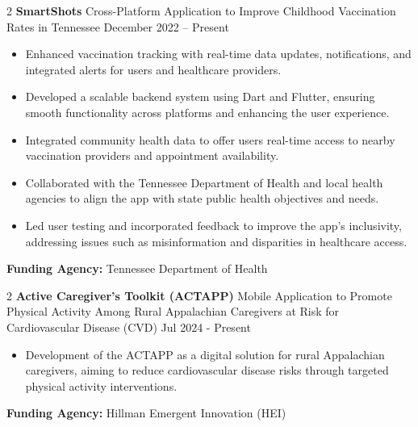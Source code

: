 \documentclass[10pt, letterpaper]{article}
\newenvironment{highlights}{
    \begin{itemize}[
        topsep=0.10 cm,
        parsep=0.10 cm,
        partopsep=0pt,
        itemsep=0pt,
        leftmargin=0 cm + 10pt
    ]
}{
    \end{itemize}
} %
\newenvironment{twocolentry}[2][]{
    \onecolentry
    \def\secondColumn{#2}
    \setcolumnwidth{\fill, 4.5 cm}
    \begin{paracol}{2}
}{
    \switchcolumn \raggedleft \secondColumn
    \end{paracol}
    \endonecolentry
} %
\begin{document}
        \vspace{0.3cm} \begin{twocolentry}{December 2022 – Present} \textbf{SmartShots} \textbar Cross-Platform Application to Improve Childhood Vaccination Rates in Tennessee \end{twocolentry} \begin{highlights} \item Enhanced vaccination tracking with real-time data updates, notifications, and integrated alerts for users and healthcare providers. \item Developed a scalable backend system using Dart and Flutter, ensuring smooth functionality across platforms and enhancing the user experience. \item Integrated community health data to offer users real-time access to nearby vaccination providers and appointment availability. \item Collaborated with the Tennessee Department of Health and local health agencies to align the app with state public health objectives and needs. \item Led user testing and incorporated feedback to improve the app’s inclusivity, addressing issues such as misinformation and disparities in healthcare access. \end{highlights} \vspace{0.3cm} \noindent \textbf{Funding Agency:} Tennessee Department of Health
        
        \vspace{0.3cm} \begin{twocolentry}{Jul 2024 - Present} \textbf{Active Caregiver’s Toolkit (ACTAPP)} \textbar Mobile Application to Promote Physical Activity Among Rural Appalachian Caregivers at Risk for Cardiovascular Disease (CVD) \end{twocolentry} \begin{highlights} \item Development of the ACTAPP as a digital solution for rural Appalachian caregivers, aiming to reduce cardiovascular disease risks through targeted physical activity interventions. 
        \end{highlights} \vspace{0.3cm} \noindent \textbf{Funding Agency:} Hillman Emergent Innovation (HEI)
\end{document}
